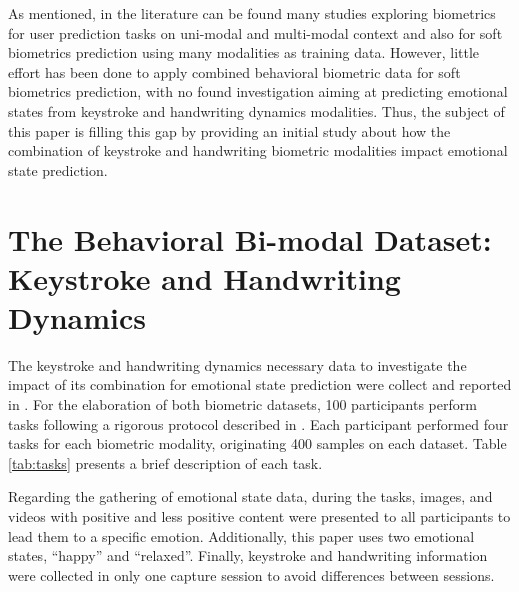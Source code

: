\documentclass[conference]{IEEEtran}
\begin{document}
As mentioned, in the literature can be found many studies exploring biometrics for user prediction tasks on uni-modal and multi-modal context and also for soft biometrics prediction using many modalities as training data.
However, little effort has been done to apply combined behavioral biometric data for soft biometrics prediction, with no found investigation aiming at predicting emotional states from keystroke and handwriting dynamics modalities. Thus, the subject of this paper is filling this gap by providing an initial study about how the combination of keystroke and handwriting biometric modalities impact emotional state prediction.



\section{The Behavioral Bi-modal Dataset: Keystroke and Handwriting Dynamics}
\label{dataset}

The keystroke and handwriting dynamics necessary data to investigate the impact of its combination for emotional state prediction were collect and reported in \cite{cheng-thesis, cheng-hw-gender, cheng-emotional}. For the elaboration of both biometric datasets, 100 participants perform tasks following a rigorous protocol described in \cite{cheng-thesis}. Each participant performed four tasks for each biometric modality, originating 400 samples on each dataset. Table \ref{tab:tasks} presents a brief description of each task.

Regarding the gathering of emotional state data, during the tasks, images, and videos with positive and less positive content were presented to all participants to lead them to a specific emotion. Additionally, this paper uses two emotional states, ``happy'' and ``relaxed''. Finally, keystroke and handwriting information were collected in only one capture session to avoid differences between sessions.
\end{document}
